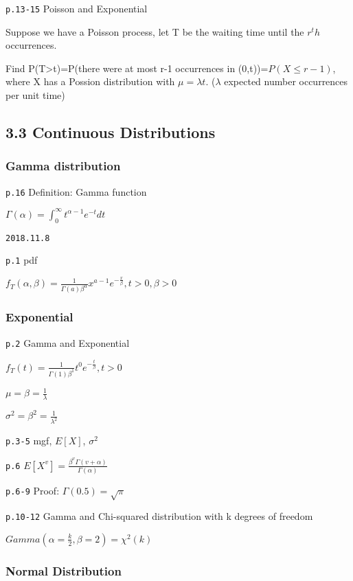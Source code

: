 \documentclass[]{tufte-book}
\begin{document}
\texttt{p.13-15} Poisson and Exponential

Suppose we have a Poisson process, let T be the waiting time until the
\(r^th\) occurrences.

Find P(T\textgreater{}t)=P(there were at most r-1 occurrences in
(0,t))=\(P(X\le r-1)\), where X has a Possion distribution with
\(\mu=\lambda t\). (\(\lambda\) expected number occurrences per unit
time)

\hypertarget{continuous-distributions}{%
\subsection{3.3 Continuous
Distributions}\label{continuous-distributions}}

\hypertarget{gamma-distribution}{%
\subsubsection{Gamma distribution}\label{gamma-distribution}}

\texttt{p.16} Definition: Gamma function

\(\Gamma(\alpha)=\int_0^\infty t^{\alpha-1}e^{-t}dt\)

\texttt{2018.11.8}

\texttt{p.1} pdf

\(f_T(\alpha,\beta)=\frac{1}{\Gamma(a)\beta^{\alpha}}x^{a-1}e^{-\frac{x}\beta},t>0,\beta>0\)

\hypertarget{exponential}{%
\subsubsection{Exponential}\label{exponential}}

\texttt{p.2} Gamma and Exponential

\(f_T(t)=\frac1{\Gamma(1)\beta^1}t^0e^{-\frac{t}\beta},t>0\)

\(\mu=\beta=\frac1\lambda\)

\(\sigma^2=\beta^2=\frac1{\lambda^2}\)

\texttt{p.3-5} mgf, \(E[X]\), \(\sigma^2\)

\texttt{p.6} \(E[X^v]=\frac{\beta^v\Gamma(v+\alpha)}{\Gamma(\alpha)}\)

\texttt{p.6-9} Proof: \(\Gamma(0.5)=\sqrt\pi\)

\texttt{p.10-12} Gamma and Chi-squared distribution with k degrees of
freedom

\(Gamma(\alpha=\frac{k}2,\beta=2)=\chi^2(k)\)

\hypertarget{normal-distribution}{%
\subsubsection{Normal Distribution}\label{normal-distribution}}
\end{document}
